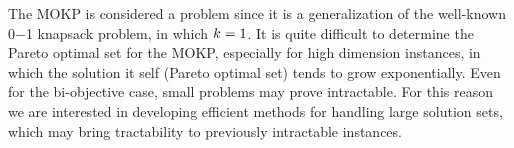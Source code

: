 The MOKP is considered a \nphard{} problem since it is a generalization
of the well-known 0$-$1 knapsack problem, in which $k = 1$.
It is quite difficult to determine the Pareto optimal set for the MOKP,
especially for high dimension instances, in which the solution it self
(Pareto optimal set) tends to grow exponentially.
Even for the bi-objective case, small problems may prove intractable.
For this reason we are interested in developing efficient methods for
handling large solution sets, which may bring tractability to previously
intractable instances.

